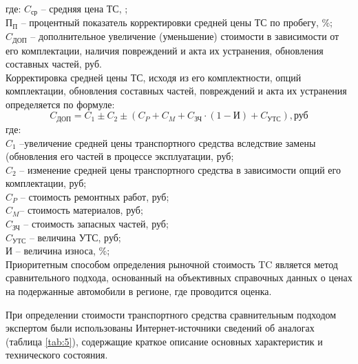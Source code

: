 \noindent где: $C_\text{ср}$ -- средняя цена ТС, ;\\
$ \text{П}_\text{П}$ -- процентный показатель корректировки средней цены ТС по пробегу, \%;\\
$ C_\text{ДОП}$ -- дополнительное увеличение (уменьшение) стоимости в зависимости от его комплектации, наличия повреждений и акта их устранения, обновления составных частей, руб.\\
Корректировка средней цены ТС, исходя из его комплектности, опций комплектации, обновления составных частей, повреждений и акта их устранения определяется по формуле:
\begin{equation}\label{eq:b}
  C_\text{ДОП}=C_1\pm C_2\pm\left( C_P+C_M+C_\text{ЗЧ}\cdot\left( 1-\text{И}\right) +C_\text{УТС}\right), \text{руб}  
\end{equation} 
где:\\
$C_1$ --увеличение средней цены транспортного средства вследствие замены (обновления его частей в процессе эксплуатации, руб;\\
$ C_2$ -- изменение средней цены транспортного средства в зависимости опций его комплектации, руб;\\
 $ C_P $ -- стоимость ремонтных работ, руб;\\
 $C_M$--  стоимость материалов, руб;\\
 $C_\text{ЗЧ}  $ -- стоимость запасных частей, руб;\\
 $ C_\text{УТС} $ -- величина УТС, руб;\\
 $ \text{И} $ -- величина износа, \%;\\
 
Приоритетным способом определения рыночной стоимость TC
является метод сравнительного подхода, основанный на объективных справочных данных о ценах на подержанные автомобили  в регионе, где проводится оценка.
   
При определении стоимости транспортного средства сравнительным подходом экспертом были использованы  Интернет-источники сведений об аналогах (таблица \ref{tab:5}), содержащие краткое описание основных характеристик и технического состояния. 
 
